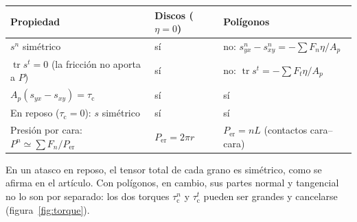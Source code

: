 \documentclass[11pt,a4paper]{article}
\begin{document}
\begin{center}
\small
\begin{tabular}{>{\raggedright}p{}>{\raggedright}p{}p{}}
  \toprule
  Propiedad & Discos ($\eta = 0$) & Polígonos \\
  \midrule
  $s^n$ simétrico & sí & no: $s^n_{yx}-s^n_{xy} = -\sum F_n\eta/A_p$ \\
  $\operatorname{tr}s^t = 0$ (la fricción no aporta a $P$)
    & sí & no: $\operatorname{tr}s^t = -\sum F_t\eta/A_p$ \\
  $A_p(s_{yx}-s_{xy}) = \tau_\text{c}$ & sí & sí \\
  En reposo ($\tau_\text{c} = 0$): $s$ simétrico & sí & sí \\
  Presión por cara: $P^n \simeq \sum F_n/P_\text{er}$
    & $P_\text{er} = 2\pi r$ & $P_\text{er} = nL$ (contactos cara--cara) \\
  \bottomrule
\end{tabular}
\end{center}

En un atasco en reposo, el tensor total de cada grano es simétrico, como
se afirma en el artículo. Con polígonos, en cambio, sus partes normal y
tangencial no lo son por separado: los dos torques $\tau^n_\text{c}$ y
$\tau^t_\text{c}$ pueden ser grandes y cancelarse
(figura~\ref{fig:torque}).
\end{document}
